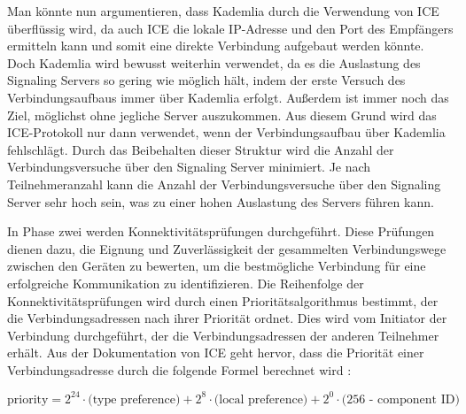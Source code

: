 Man könnte nun argumentieren, dass Kademlia durch die Verwendung von ICE überflüssig wird, da auch ICE die lokale IP-Adresse und den Port des Empfängers ermitteln kann und somit eine direkte Verbindung aufgebaut werden könnte. Doch Kademlia wird bewusst weiterhin verwendet, da es die Auslastung des Signaling Servers so gering wie möglich hält, indem der erste Versuch des Verbindungsaufbaus immer über Kademlia erfolgt. Außerdem ist immer noch das Ziel, möglichst ohne jegliche Server auszukommen. Aus diesem Grund wird das ICE-Protokoll nur dann verwendet, wenn der Verbindungsaufbau über Kademlia fehlschlägt. Durch das Beibehalten dieser Struktur wird die Anzahl der Verbindungsversuche über den Signaling Server minimiert. Je nach Teilnehmeranzahl kann die Anzahl der Verbindungsversuche über den Signaling Server sehr hoch sein, was zu einer hohen Auslastung des Servers führen kann.

In Phase zwei werden Konnektivitätsprüfungen durchgeführt. Diese Prüfungen dienen dazu, die Eignung und Zuverlässigkeit der gesammelten Verbindungswege zwischen den Geräten zu bewerten, um die bestmögliche Verbindung für eine erfolgreiche Kommunikation zu identifizieren. Die Reihenfolge der Konnektivitätsprüfungen wird durch einen Prioritätsalgorithmus bestimmt, der die Verbindungsadressen nach ihrer Priorität ordnet. Dies wird vom Initiator der Verbindung durchgeführt, der die Verbindungsadressen der anderen Teilnehmer erhält. Aus der Dokumentation von ICE geht hervor, dass die Priorität einer Verbindungsadresse durch die folgende Formel berechnet wird \parencite[S. 22]{rfc8445_ICE}:

\begin{equation}
    \label{eq:ice_priority}
    \text{priority} = \text{2}^{24} \cdot \text{(type preference)} + \text{2}^{8} \cdot \text{(local preference)} + \text{2}^{0} \cdot \text{(256 - component ID)}
\end{equation}

